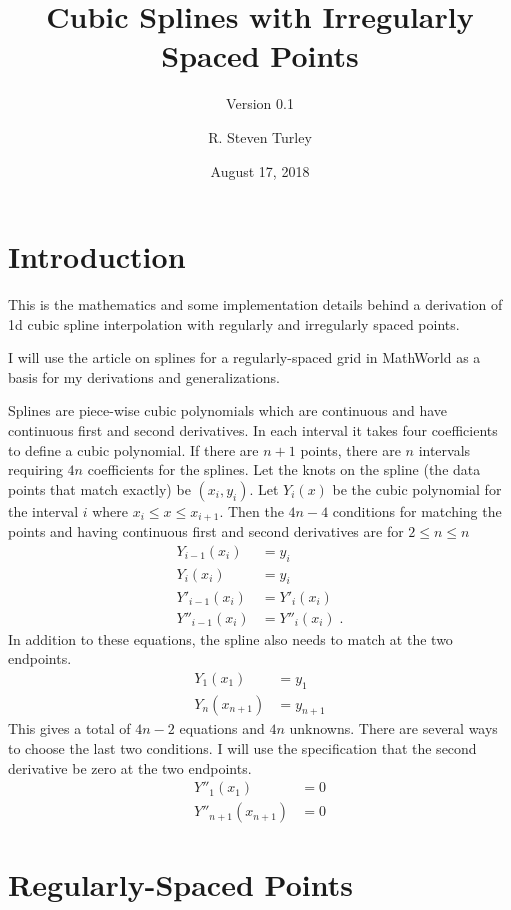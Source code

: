 \documentclass{scrartcl}
\title{Cubic Splines with Irregularly Spaced Points}
\subtitle{Version 0.1}
\author{R. Steven Turley}
\date{August 17, 2018}
\begin{document}
\maketitle
\tableofcontents

\section{Introduction}
This is the mathematics and some implementation details
behind a derivation of 1d cubic spline interpolation with
regularly and irregularly spaced points.

I will use the article on splines for a regularly-spaced
grid in MathWorld\cite{mathworld} as a basis for my
derivations and generalizations.

Splines are piece-wise cubic polynomials which are continuous
and have continuous first and second derivatives. In each interval
it takes four coefficients to define a cubic polynomial. If there
are $n+1$ points, there are $n$ intervals requiring $4n$ coefficients
for the splines. Let the knots on the spline (the data points that
match exactly) be $(x_i,y_i)$. Let $Y_i(x)$ be the cubic polynomial for
the interval $i$ where $x_i\leq x\leq x_{i+1}$. Then the $4n-4$ conditions
for matching the points and having continuous first and second derivatives
are for $2\leq n \leq n$
\begin{align}
Y_{i-1}(x_i) &= y_i \label{eq:cbegin} \\
Y_i(x_i) &= y_i\\
Y'_{i-1}(x_i) &= Y'_i(x_i)\\
Y''_{i-1}(x_i) &= Y''_i(x_i)\;. \label{eq:c2}
\end{align}
In addition to these equations, the spline also needs to match
at the two endpoints.
\begin{align}
Y_1(x_1) &= y_1\\
Y_n(x_{n+1}) &= y_{n+1}
\end{align}
This gives a total of $4n-2$ equations and $4n$ unknowns. There
are several ways to choose the last two conditions. I will use the
specification that the second derivative be zero at the two endpoints.
\begin{align}
Y''_1(x_1) &= 0 \label{eq:bslope}\\
Y''_{n+1}(x_{n+1}) &= 0 \label{eq:eslope}
\end{align}

\section{Regularly-Spaced Points}
\end{document}
